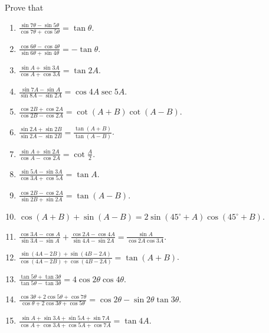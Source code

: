 Prove that

\begin{enumerate}[resume]
\item $\frac{\sin7\theta - \sin5\theta}{\cos7\theta + \cos5\theta} = \tan\theta$.

\item $\frac{\cos6\theta - \cos4\theta}{\sin6\theta + \sin4\theta} = -\tan\theta$.

\item $\frac{\sin A + \sin 3A}{\cos A + \cos 3A} = \tan 2A$.

\item $\frac{\sin 7A - \sin A}{\sin 8A - \sin 2A} = \cos 4A\sec 5A$.

\item $\frac{\cos 2B + \cos 2A}{\cos 2B - \cos 2A} = \cot(A + B)\cot(A - B)$.

\item $\frac{\sin 2A + \sin 2B}{\sin 2A - \sin 2B} = \frac{\tan(A + B)}{\tan(A - B)}$.

\item $\frac{\sin A + \sin 2A}{\cos A - \cos 2A} = \cot \frac{A}{2}$.

\item $\frac{\sin 5A - \sin 3A}{\cos 3A + \cos 5A} = \tan A$.

\item $\frac{\cos 2B - \cos 2A}{\sin 2B + \sin 2A} = \tan(A - B)$.

\item $\cos (A + B) + \sin(A - B) = 2\sin(45^\circ + A)\cos(45^\circ + B)$.

\item $\frac{\cos 3A - \cos A}{\sin 3A - \sin A} + \frac{\cos 2A - \cos 4A}{\sin 4A - \sin 2A} = \frac{\sin A}{\cos 2A\cos 3A}$.

\item $\frac{\sin (4A - 2B) + \sin (4B - 2A)}{\cos (4A - 2B) + \cos (4B - 2A)} = \tan(A + B)$.

\item $\frac{\tan 5\theta + \tan 3\theta}{\tan 5\theta - \tan 3\theta} = 4\cos 2\theta\cos 4\theta$.

\item $\frac{\cos 3\theta + 2\cos5\theta + \cos 7\theta}{\cos\theta + 2\cos3\theta + \cos 5\theta} = \cos 2\theta - \sin
    2\theta\tan 3\theta$.

\item $\frac{\sin A + \sin 3A + \sin 5A + \sin 7A}{\cos A + \cos 3A + \cos 5A + \cos 7A} = \tan 4A$.


\end{enumerate}
